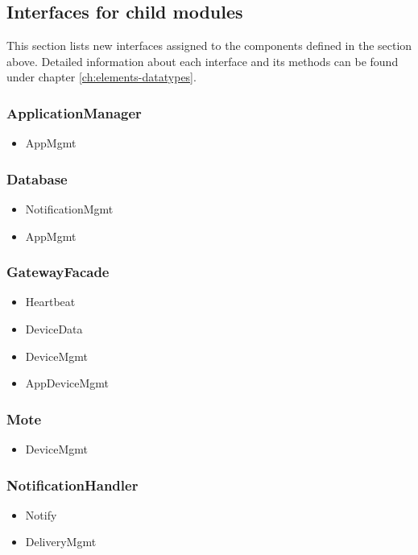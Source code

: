 \subsection{Interfaces for child modules}\label{add1-interfaces}
    This section lists new interfaces assigned to the components defined
    in the section above. Detailed information about each interface and
    its methods can be found under chapter \ref{ch:elements-datatypes}. \\

    \subsubsection{ApplicationManager}
        \begin{itemize}
            \item AppMgmt
        \end{itemize}

    \subsubsection{Database}
        \begin{itemize}
            \item NotificationMgmt
            \item AppMgmt
        \end{itemize}

    \subsubsection{GatewayFacade}
        \begin{itemize}
            \item Heartbeat
            \item DeviceData
            \item DeviceMgmt
            \item AppDeviceMgmt
        \end{itemize}

    \subsubsection{Mote}
        \begin{itemize}
            \item DeviceMgmt
        \end{itemize}

    \subsubsection{NotificationHandler}
        \begin{itemize}
            \item Notify
            \item DeliveryMgmt
        \end{itemize}

